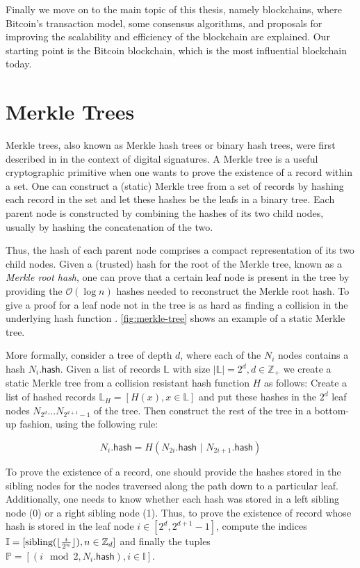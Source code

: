 \documentclass{style/kththesis}
\DeclarePairedDelimiter\floor{\lfloor}{\rfloor}
\begin{document}
Finally we move on to the main topic of this thesis, namely blockchains, where Bitcoin's transaction model, some consensus algorithms, and proposals for improving the scalability and efficiency of the blockchain are explained. Our starting point is the Bitcoin blockchain, which is the most influential blockchain today.

\section{Merkle Trees}
\label{merkle-tree}
Merkle trees, also known as Merkle hash trees or binary hash trees, were first described in \cite{Merkle87} in the context of digital signatures. A Merkle tree is a useful cryptographic primitive when one wants to prove the existence of a record within a set. One can construct a (static) Merkle tree from a set of records by hashing each record in the set and let these hashes be the leafs in a binary tree. Each parent node is constructed by combining the hashes of its two child nodes, usually by hashing the concatenation of the two.

Thus, the hash of each parent node comprises a compact representation of its two child nodes. Given a (trusted) hash for the root of the Merkle tree, known as a \emph{Merkle root hash}, one can prove that a certain leaf node is present in the tree by providing the $\mathcal{O}(\log n)$ hashes needed to reconstruct the Merkle root hash. To give a proof for a leaf node not in the tree is as hard as finding a collision in the underlying hash function \cite{Coronado05}. \cref{fig:merkle-tree} shows an example of a static Merkle tree.

More formally, consider a tree of depth $d$, where each of the $N_i$ nodes contains a hash $N_i.\mathsf{hash}$. Given a list of records $\mathbb{L}$ with size $|\mathbb{L}|=2^d, d\in \mathbb{Z}_{+}$ we create a static Merkle tree from a collision resistant hash function $H$ as follows: Create a list of hashed records $\mathbb{L}_H = [H(x), x \in \mathbb{L}]$ and put these hashes in the $2^{d}$ leaf nodes $N_{2^{d}}\ldots N_{2^{d+1}-1}$ of the tree. Then construct the rest of the tree in a bottom-up fashion, using the following rule:

\begin{equation}
    N_i.{\mathsf{hash}} = H(N_{2i}.\mathsf{hash} \text{ | } N_{2i+1}.\mathsf{hash})
\end{equation}

To prove the existence of a record, one should provide the hashes stored in the sibling nodes for the nodes traversed along the path down to a particular leaf. Additionally, one needs to know whether each hash was stored in a left sibling node (0) or a right sibling node (1). Thus, to prove the existence of record whose hash is stored in the leaf node $i \in [2^{d}, 2^{d+1}-1]$, compute the indices $\mathbb{I} = [ \text{sibling}(\floor{\frac{i}{2^n}}), n \in \mathbb{Z}_d]$ and finally the tuples $\mathbb{P} = [ (i \mod 2, N_i.\mathsf{hash}), i \in \mathbb{I} ]$.
\end{document}
